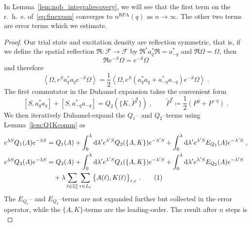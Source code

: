 \documentclass[12pt,a4paper]{article}
\numberwithin{equation}{section}
\newcommand{\cF}{\mathcal{F}}
\newcommand{\fR}{\mathfrak{R}}
\newcommand{\1}{\mathbb{I}}
\newcommand{\di}{\textnormal{d}}
\newcommand{\RPA}{\mathrm{RPA}}
\newcommand{\tagg}[1]{ \stepcounter{equation} \tag{\theequation}
\label{#1} } %
\newcommand{\Z}{\mathbb{Z}}
\newcommand{\half}{\frac{1}{2}}
\newcommand{\eva}[1]{\left\langle #1 \right\rangle}
\theoremstyle{plain}
\theoremstyle{definition}
\theoremstyle{remark}
\theoremstyle{plain}
\theoremstyle{definition}
\theoremstyle{remark}
\begin{document}
In Lemma~\ref{lem:nqb_integralrecovery}, we will see that the first term on the r.~h.~s. of~\eqref{eq:finexpan} converges to $ n^{\RPA}(q) $ as $ n \to \infty $.  The other two terms are error terms which we estimate.


\begin{proof}
Our trial state and excitation density are reflection symmetric, that is, if we define the spatial reflection $ \fR: \cF \to \cF $ by $ \fR^* a_q^* \fR = a^*_{-q} $ and $ \fR \Omega = \Omega $, then
\begin{equation} \label{eq:reflectionsymmetry}
	\fR e^{-S} \Omega = e^{-S} \Omega
\end{equation}
and therefore
\begin{equation}
	\eva{\Omega, e^{S} a_q^* a_q e^{-S} \Omega} = \half \eva{\Omega, e^{S} (a_q^* a_q + a_{-q}^* a_{-q}) e^{-S} \Omega} \;.
\end{equation}
The first commutator in the Duhamel expansion takes the convenient form
\begin{equation} \label{eq:firstcommutator}
	[S, a_q^* a_q] + [S, a_{-q}^* a_{-q}]
	= Q_2(\{K,\tilde{P}^q\}) \;, \qquad
	\tilde{P}^q \coloneq \half(P^q + P^{-q}) \;.
\end{equation}
We then iteratively Duhamel-expand the $ Q_1$-- and $ Q_2 $--terms using Lemma~\ref{lem:Q1Kcomm} as 
\begin{align*}
	e^{\lambda S} Q_1(A) e^{-\lambda S}
	&= Q_1(A) + \int_0^{\lambda} \di \lambda' e^{\lambda' S} Q_2(\{A,K\}) e^{-\lambda' S}
		+ \int_0^{\lambda} \di \lambda' e^{\lambda' S} E_{Q_1}(A) e^{-\lambda' S} \;, \\
	e^{\lambda S} Q_2(A) e^{-\lambda S}
	&= Q_2(A) + \int_0^{\lambda} \di \lambda' e^{\lambda' S} Q_1(\{A,K\}) e^{-\lambda' S}
		+ \int_0^{\lambda} \di \lambda' e^{\lambda' S} E_{Q_2}(A) e^{-\lambda' S} \\
	&\quad + \lambda \sum_{\ell \in \Z^3_*} \sum_{r \in L_{\ell}} \big\{ A(\ell), K(\ell) \big\}_{r,r} \;. \tagg{eq:expand}
\end{align*}
The $ E_{Q_1}$-- and $ E_{Q_2} $--terms are not expanded further but collected in the error operator, while the $ \{A,K\} $-terms are the leading-order. The result after $ n $ steps is
\begin{equation}

\end{equation}
\end{proof}
\end{document}
